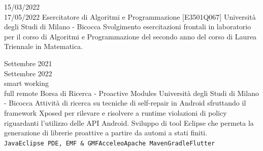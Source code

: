 \documentclass[9pt]{developercv}
\begin{document}
\begin{entrylist}
	\entry
	{15/03/2022 \\ 17/05/2022}
	{Esercitatore di Algoritmi e Programmazione [E3501Q067]}
	{Università degli Studi di Milano - Bicocca}
	{Svolgimento esercitazioni frontali in laboratorio per il corso di Algoritmi e Programmazione del secondo anno del corso di Laurea Triennale in Matematica.}

	\entry
	{Settembre 2021 \\ Settembre 2022	\\\footnotesize{smart working}\\\footnotesize{full remote}}
	{Borsa di Ricerca - Proactive Modules}
	{Università degli Studi di Milano - Bicocca}
	{Attività di ricerca su tecniche di self-repair in Android sfruttando il framework Xposed per rilevare e risolvere a runtime violazioni di policy riguardanti l'utilizzo delle API Android. Sviluppo di tool Eclipse che permeta la generazione di librerie proattive a partire da automi a stati finiti. \\ \texttt{Java}\slashsep\texttt{Eclipse PDE, EMF \& GMF}\slashsep\texttt{Acceleo}\slashsep\texttt{Apache Maven}\slashsep\texttt{Gradle}\slashsep\texttt{Flutter}}
	

\end{entrylist}
\end{document}

